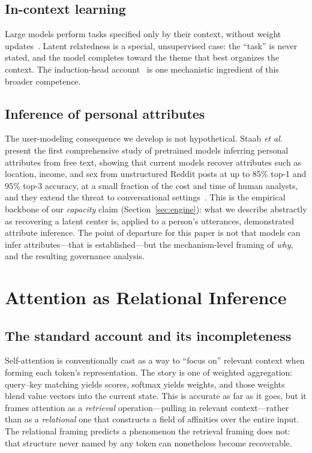 \documentclass[conference]{IEEEtran}
\theoremstyle{definition}
\begin{document}
\subsection{In-context learning}
Large models perform tasks specified only by their context, without weight updates~\cite{brown2020gpt3}. Latent relatedness is a special, unsupervised case: the ``task'' is never stated, and the model completes toward the theme that best organizes the context. The induction-head account~\cite{olsson2022induction} is one mechanistic ingredient of this broader competence.

\subsection{Inference of personal attributes}
The user-modeling consequence we develop is not hypothetical. Staab \emph{et al.} present the first comprehensive study of pretrained models inferring personal attributes from free text, showing that current models recover attributes such as location, income, and sex from unstructured Reddit posts at up to $85\%$ top-1 and $95\%$ top-3 accuracy, at a small fraction of the cost and time of human analysts, and they extend the threat to conversational settings~\cite{staab2024beyond}. This is the empirical backbone of our \emph{capacity} claim (Section~\ref{sec:engine}): what we describe abstractly as recovering a latent center is, applied to a person's utterances, demonstrated attribute inference. The point of departure for this paper is not that models can infer attributes---that is established---but the mechanism-level framing of \emph{why}, and the resulting governance analysis.

\section{Attention as Relational Inference}
\label{sec:mechanism}

\subsection{The standard account and its incompleteness}
Self-attention is conventionally cast as a way to ``focus on'' relevant context when forming each token's representation. The story is one of weighted aggregation: query--key matching yields scores, softmax yields weights, and those weights blend value vectors into the current state. This is accurate as far as it goes, but it frames attention as a \emph{retrieval} operation---pulling in relevant context---rather than as a \emph{relational} one that constructs a field of affinities over the entire input. The relational framing predicts a phenomenon the retrieval framing does not: that structure never named by any token can nonetheless become recoverable.
\end{document}
